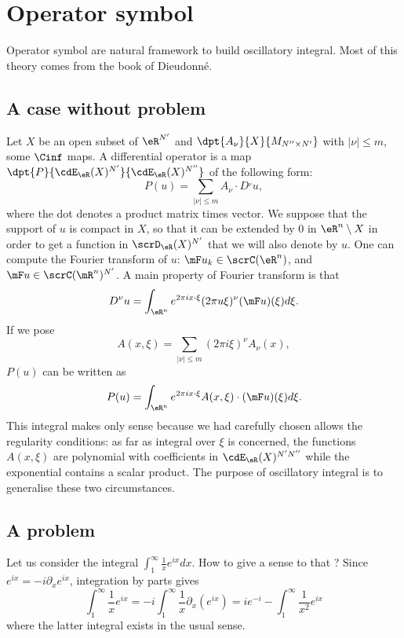 

\section{Operator symbol}

Operator symbol are natural framework to build oscillatory integral. Most of this theory comes from the book \cite{Dieu7} of Dieudonné. 

\subsection{A case without problem}
Let $X$ be an open subset of $\eR^{N'}$ and $\dpt{A_{\nu}}{X}{M_{N''\times N'}}$ with $|\nu|\leq m$, some $\Cinf$ maps. A differential operator is a map $\dpt{P}{\cdE_{\eR}(X)^{N'}}{\cdE_{\eR}(X)^{N''}}$ of the following form: 
\[
  P(u)=\sum_{|\nu|\leq m}A_{\nu}\cdot D^{_{\nu}}u,
\]
where the dot denotes a product matrix times vector. We suppose that the support of $u$ is 
compact in $X$, so that it can be extended by $0$ in $\eR^n\setminus X$ in order to get a function in $\scrD_{\eR}(X)^{N'}$ that we will also denote by $u$. One can compute the Fourier transform of $u$: $\mF u_k\in\scrC(\eR^n)$, and $\mF u\in\scrC(\mR^n)^{N'}$. A main property of Fourier transform is that
\[
   D^{\nu}u=\int_{\eR^n} e^{2\pi ix\cdot\xi}(2\pi u\xi)^{\nu}(\mF u)(\xi)d\xi.
\]
If we pose 
\[
  A(x,\xi)=\sum_{|\nu|\leq m}(2\pi i\xi)^{\nu}A_{\nu}(x),
\]
$P(u)$ can be written as
\[ 
    P(u)=\int_{\eR^n} e^{2\pi ix\cdot\xi}A(x,\xi)\cdot(\mF u)(\xi)d\xi.
\]
This integral makes only sense because we had carefully chosen allows the regularity conditions: as far as integral over $\xi$ is concerned, the functions $A(x,\xi)$ are polynomial with coefficients in $\cdE_{\eR}(X)^{N'N''}$ while the exponential contains a scalar product. The purpose of oscillatory integral is to generalise these two circumstances.

\subsection{A problem}

Let us consider the integral $\int_1^{\infty}\frac{1}{x}e^{ix}dx$. How to give a sense to that ? Since $e^{ix}=-i\partial_xe^{ix}$, integration by parts gives
\begin{equation}
 \int_1^{\infty}\frac{1}{x}e^{ix}=-i\int_1^{\infty}\frac{1}{x}\partial_x(e^{ix})
          =ie^{-i}-\int_1^{\infty}\frac{1}{x^2}e^{ix}
\end{equation}
where the latter integral exists in the usual sense.

